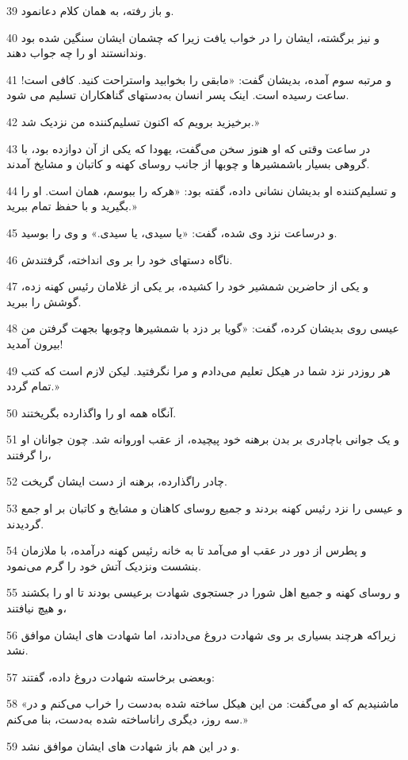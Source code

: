 \par 39 و باز رفته، به همان کلام دعانمود.
\par 40 و نیز برگشته، ایشان را در خواب یافت زیرا که چشمان ایشان سنگین شده بود وندانستند او را چه جواب دهند.
\par 41 و مرتبه سوم آمده، بدیشان گفت: «مابقی را بخوابید واستراحت کنید. کافی است! ساعت رسیده است. اینک پسر انسان به‌دستهای گناهکاران تسلیم می شود.
\par 42 برخیزید برویم که اکنون تسلیم‌کننده من نزدیک شد.»
\par 43 در ساعت وقتی که او هنوز سخن می‌گفت، یهودا که یکی از آن دوازده بود، با گروهی بسیار باشمشیرها و چوبها از جانب روسای کهنه و کاتبان و مشایخ آمدند.
\par 44 و تسلیم‌کننده او بدیشان نشانی داده، گفته بود: «هر‌که را ببوسم، همان است. او را بگیرید و با حفظ تمام ببرید.»
\par 45 و درساعت نزد وی شده، گفت: «یا سیدی، یا سیدی.» و وی را بوسید.
\par 46 ناگاه دستهای خود را بر وی انداخته، گرفتندش.
\par 47 و یکی از حاضرین شمشیر خود را کشیده، بر یکی از غلامان رئیس کهنه زده، گوشش را ببرید.
\par 48 عیسی روی بدیشان کرده، گفت: «گویا بر دزد با شمشیرها وچوبها بجهت گرفتن من بیرون آمدید!
\par 49 هر روزدر نزد شما در هیکل تعلیم می‌دادم و مرا نگرفتید. لیکن لازم است که کتب تمام گردد.»
\par 50 آنگاه همه او را واگذارده بگریختند.
\par 51 و یک جوانی باچادری بر بدن برهنه خود پیچیده، از عقب اوروانه شد. چون جوانان او را گرفتند،
\par 52 چادر راگذارده، برهنه از دست ایشان گریخت.
\par 53 و عیسی را نزد رئیس کهنه بردند و جمیع روسای کاهنان و مشایخ و کاتبان بر او جمع گردیدند.
\par 54 و پطرس از دور در عقب او می‌آمد تا به خانه رئیس کهنه درآمده، با ملازمان بنشست ونزدیک آتش خود را گرم می‌نمود.
\par 55 و روسای کهنه و جمیع اهل شورا در جستجوی شهادت برعیسی بودند تا او را بکشند و هیچ نیافتند،
\par 56 زیراکه هرچند بسیاری بر وی شهادت دروغ می‌دادند، اما شهادت های ایشان موافق نشد.
\par 57 وبعضی برخاسته شهادت دروغ داده، گفتند:
\par 58 «ماشنیدیم که او می‌گفت: من این هیکل ساخته شده به‌دست را خراب می‌کنم و در سه روز، دیگری راناساخته شده به‌دست، بنا می‌کنم.»
\par 59 و در این هم باز شهادت های ایشان موافق نشد.
